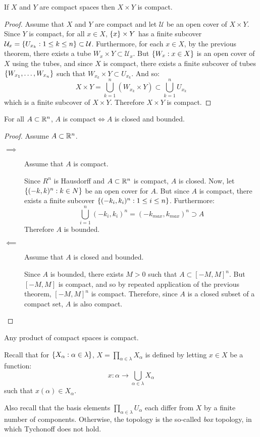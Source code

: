 \documentclass[letterpaper,12pt,fleqn]{article}
\newcommand{\U}{\mathcal{U}}
\renewcommand{\a}{\alpha}
\renewcommand{\l}{\lambda}
\begin{document}
\begin{theorem}
  If \(X\) and \(Y\) are compact spaces then \(X\times Y\) is compact.
\end{theorem}

\begin{proof}
  Assume that \(X\) and \(Y\) are compact and let \(\U\) be an open cover of \(X\times Y\).  Since \(Y\) is
  compact, for all \(x\in X\), \(\{x\}\times Y\) has a finite subcover \(\U_x=\set{U_{x_k}:1\le k\le n}\subset\U\).
  Furthermore, for each \(x\in X\), by the previous theorem, there exists a tube \(W_x\times Y\subset\U_x\).  But
  \(\{W_x:x\in X\}\) is an open cover of \(X\) using the tubes, and since \(X\) is compact, there exists a finite
  subcover of tubes \(\{W_{x_1},\ldots,W_{x_n}\}\) such that \(W_{x_k}\times Y\subset U_{x_k}\).  And so:
  \[X\times Y=\bigcup_{k=1}^n(W_{x_k}\times Y)\subset\bigcup_{k=1}^nU_{x_k}\]
  which is a finite subcover of \(X\times Y\).  Therefore \(X\times Y\) is compact.
\end{proof}

\begin{theorem}
  For all \(A\subset\mathbb{R}^n\), \(A\) is compact\(\iff A\) is closed and bounded.
\end{theorem}

\begin{proof}
  Assume \(A\subset\mathbb{R}^n\).
  \begin{description}
  \item[\(\implies\)] Assume that \(A\) is compact.

    Since \(R^n\) is Hausdorff and \(A\subset\mathbb{R}^n\) is compact, \(A\) is closed.  Now, let \(\{(-k,k)^n:k\in N\}\)
    be an open cover for \(A\).  But since \(A\) is compact, there exists a finite subcover
    \(\{(-k_i,k_i)^n:1\le i\le n\}\).  Furthermore:
    \[\bigcup_{i=1}^n(-k_i,k_i)^n=(-k_{max},k_{max})^n\supset A\]
    Therefore \(A\) is bounded.

  \item[\(\impliedby\)] Assume that \(A\) is closed and bounded.

    Since \(A\) is bounded, there exists \(M>0\) such that \(A\subset[-M,M]^n\).  But \([-M,M]\) is compact, and so
    by repeated application of the previous theorem, \([-M,M]^n\) is compact.  Therefore, since \(A\) is a closed
    subset of a compact set, \(A\) is also compact.
  \end{description}
\end{proof}

\begin{theorem}[Tychonoff]
  Any product of compact spaces is compact.
\end{theorem}

Recall that for \(\set{X_{\a}:\a\in\l}\), \(\displaystyle X=\prod_{\a\in\l}X_{\a}\) is defined by letting \(x\in X\) be
a function:
\[x:\a\to\bigcup_{\a\in\l}X_{\a}\]
such that \(x(\a)\in X_{\a}\).

Also recall that the basis elements \(\displaystyle\prod_{\a\in\l}U_{\a}\) each differ from \(X\) by a finite number
of components.  Otherwise, the topology is the so-called \emph{box} topology, in which Tychonoff does not hold.
\end{document}

